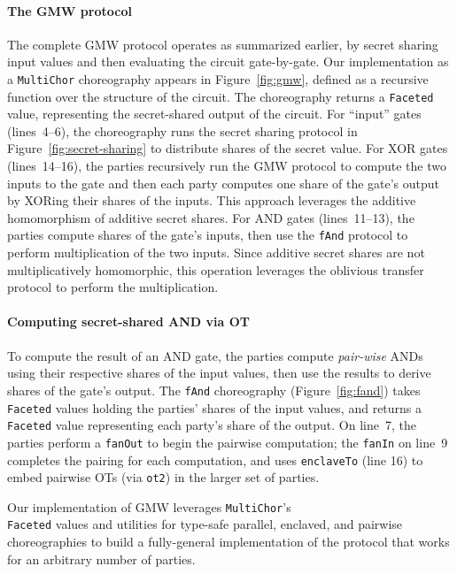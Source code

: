 \documentclass[sigplan,screen]{acmart}
\newcommand{\inlinecode}[2][haskell]{\texttt{#2}}
\newcommand{\MultiChor}{\texttt{Multi\-Chor}\xspace}
\begin{document}
\paragraph{The GMW protocol}
The complete GMW protocol operates as summarized earlier, by secret sharing input values and then evaluating the circuit gate-by-gate. Our implementation as a \MultiChor choreography appears in Figure~\ref{fig:gmw}, defined as a recursive function over the structure of the circuit. The choreography returns a \inlinecode{Faceted} value, representing the secret-shared output of the circuit. For ``input'' gates (lines~4--6), the choreography runs the secret sharing protocol in Figure~\ref{fig:secret-sharing} to distribute shares of the secret value. For XOR gates (lines~14--16), the parties recursively run the GMW protocol to compute the two inputs to the gate and then each party computes one share of the gate's output by XORing their shares of the inputs. This approach leverages the additive homomorphism of additive secret shares. For AND gates (lines~11--13), the parties compute shares of the gate's inputs, then use the \inlinecode{fAnd} protocol to perform multiplication of the two inputs. Since additive secret shares are not multiplicatively homomorphic, this operation leverages the oblivious transfer protocol to perform the multiplication.

\paragraph{Computing secret-shared AND via OT}
To compute the result of an AND gate, the parties compute \emph{pair-wise} ANDs using their respective shares of the input values, then use the results to derive shares of the gate's output. The \inlinecode{fAnd} choreography (Figure~\ref{fig:fand}) takes \inlinecode{Faceted} values holding the parties' shares of the input values, and returns a \inlinecode{Faceted} value representing each party's share of the output. On line~7, the parties perform a \inlinecode{fanOut} to begin the pairwise computation; the \inlinecode{fanIn} on line~9 completes the pairing for each computation, and uses \inlinecode{enclaveTo} (line 16) to embed pairwise OTs (via \inlinecode{ot2}) in the larger set of parties.

Our implementation of GMW leverages \MultiChor's
\\
\inlinecode{Faceted} values and utilities for type-safe parallel, enclaved, and pairwise choreographies to build a fully-general implementation of the protocol that works for an arbitrary number of parties.
\end{document}

